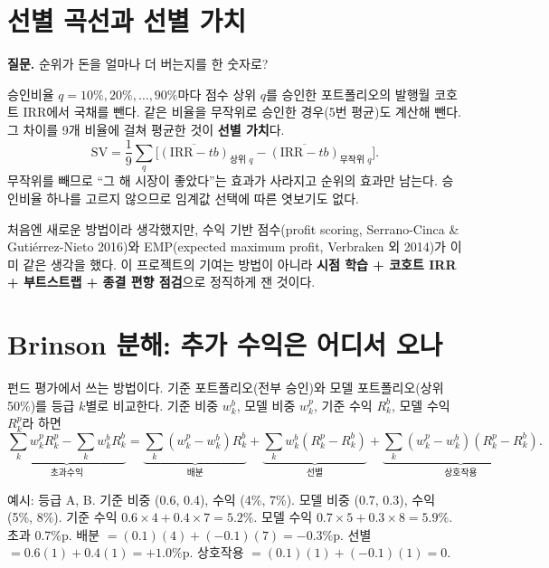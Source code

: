 \section{선별 곡선과 선별 가치}
\textbf{질문.} 순위가 돈을 얼마나 더 버는지를 한 숫자로?

승인비율 $q=10\%,20\%,\dots,90\%$마다 점수 상위 $q$를 승인한 포트폴리오의 발행월 코호트 IRR에서 국채를 뺀다. 같은 비율을 무작위로 승인한 경우(5번 평균)도 계산해 뺀다. 그 차이를 9개 비율에 걸쳐 평균한 것이 \textbf{선별 가치}다.
\[
\mathrm{SV}=\frac19\sum_{q}\Big[\overline{(\mathrm{IRR}-tb)}_{\text{상위 }q}-\overline{(\mathrm{IRR}-tb)}_{\text{무작위 }q}\Big].
\]
무작위를 빼므로 ``그 해 시장이 좋았다''는 효과가 사라지고 순위의 효과만 남는다. 승인비율 하나를 고르지 않으므로 임계값 선택에 따른 엿보기도 없다.

\begin{insight}[선행 연구]
처음엔 새로운 방법이라 생각했지만, 수익 기반 점수(profit scoring, Serrano-Cinca \& Guti\'errez-Nieto 2016)와 EMP(expected maximum profit, Verbraken 외 2014)가 이미 같은 생각을 했다. 이 프로젝트의 기여는 방법이 아니라 \textbf{시점 학습 + 코호트 IRR + 부트스트랩 + 종결 편향 점검}으로 정직하게 잰 것이다.
\end{insight}

\section{Brinson 분해: 추가 수익은 어디서 오나}
펀드 평가에서 쓰는 방법이다. 기준 포트폴리오(전부 승인)와 모델 포트폴리오(상위 50\%)를 등급 $k$별로 비교한다. 기준 비중 $w^b_k$, 모델 비중 $w^p_k$, 기준 수익 $R^b_k$, 모델 수익 $R^p_k$라 하면
\[
\underbrace{\sum_k w^p_kR^p_k-\sum_k w^b_kR^b_k}_{\text{초과수익}}
=\underbrace{\sum_k(w^p_k-w^b_k)R^b_k}_{\text{배분}}
+\underbrace{\sum_k w^b_k(R^p_k-R^b_k)}_{\text{선별}}
+\underbrace{\sum_k(w^p_k-w^b_k)(R^p_k-R^b_k)}_{\text{상호작용}} .
\]

\begin{workout}[두 등급 Brinson]
 예시: 등급 A, B. 기준 비중 (0.6, 0.4), 수익 (4\%, 7\%). 모델 비중 (0.7, 0.3), 수익 (5\%, 8\%).
 기준 수익 $0.6\times4+0.4\times7=5.2\%$. 모델 수익 $0.7\times5+0.3\times8=5.9\%$. 초과 0.7\%p.
 배분 $=(0.1)(4)+(-0.1)(7)=-0.3\%$p. 
 선별 $=0.6(1)+0.4(1)=+1.0\%$p. 
 상호작용 $=(0.1)(1)+(-0.1)(1)=0$.
\end{workout}

